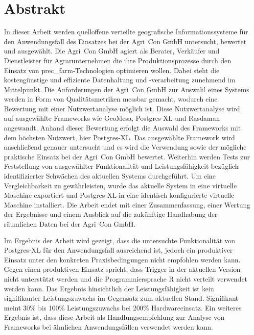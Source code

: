 
\chapter*{Abstrakt}
\label{sec:Abstrakt}
In dieser Arbeit werden quelloffene verteilte geografische Informationssysteme für den Anwendungsfall des Einsatzes bei der Agri~Con GmbH untersucht, bewertet und ausgewählt.
Die Agri~Con GmbH agiert als Berater, Verkäufer und Dienstleister für Agrarunternehmen die ihre Produktionsprozesse durch den Einsatz von \Gls{prec_farm}-Technologien optimieren wollen.
Dabei steht die kostengünstige und effiziente Datenhaltung und -verarbeitung zunehmend im Mittelpunkt.
Die Anforderungen der Agri~Con GmbH zur Auswahl eines Systems werden in Form von Qualitätsmetriken messbar gemacht, wodurch eine Bewertung mit einer Nutzwertanalyse möglich ist.
Diese Nutzwertanalyse wird auf ausgewählte Frameworks wie GeoMesa, Postgres-XL und Rasdaman angewandt.
Anhand dieser Bewertung erfolgt die Auswahl des Frameworks mit dem höchsten Nutzwert, hier Postgres-XL.
Das ausgewählte Framework wird anschließend genauer untersucht und es wird die Verwendung sowie der mögliche praktische Einsatz bei der Agri~Con GmbH bewertet.
Weiterhin werden Tests zur Feststellung von ausgewählter Funktionalität und Leistungsfähigkeit bezüglich identifizierter Schwächen des aktuellen Systems durchgeführt.
Um eine Vergleichbarkeit zu gewährleisten, wurde das aktuelle System in eine virtuelle Maschine exportiert und Postgres-XL in eine identisch konfigurierte virtuelle Maschine installiert.
Die Arbeit endet mit einer Zusammenfassung, einer Wertung der Ergebnisse und einem Ausblick auf die zukünftige Handhabung der räumlichen Daten bei der Agri~Con GmbH.

Im Ergebnis der Arbeit wird gezeigt, dass die untersuchte Funktionalität von Postgres-XL für den Anwendungsfall ausreichend ist, jedoch ein produktiver Einsatz unter den konkreten Praxisbedingungen nicht empfohlen werden kann.
Gegen einen produktiven Einsatz spricht, dass Trigger in der aktuellen Version nicht unterstützt werden und die Programmiersprache R nicht verteilt verwendet werden kann.
Das Ergebnis hinsichtlich der Leistungsfähigkeit ist kein signifikanter Leistungszuwachs im Gegensatz zum aktuellen Stand.
Signifikant meint 30\%{} bis 100\%{} Leistungszuwachs bei 200\%{} Hardwareeinsatz.
Ein weiteres Ergebnis ist, dass diese Arbeit als Handlungsempfehlung zur Analyse von Frameworks bei ähnlichen Anwendungsfällen verwendet werden kann.